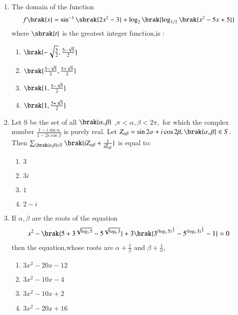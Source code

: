 \documentclass[journal]{IEEEtran}
\begin{document}
\begin{enumerate}
    \item The domain of the function 
    \begin{align*}
        f\brak{x} = \sin^{-1}\sbrak{2x^2 - 3}+ \log_2\brak{\log_{1/2}\brak{x^2 - 5x + 5}}
    \end{align*} where $\sbrak{t}$ is the greatest integer function,is :
    
    \begin{enumerate}
        \item $\brak{-\sqrt{\frac{5}{2}},\frac{5-\sqrt{5}}{2}}$
        \item $\brak{\frac{5-\sqrt{5}}{2}, \frac{5+\sqrt{5}}{2}}$
        \item $\brak{1,\frac{5-\sqrt{5}}{2}}$ 
        \item $\brak{1,\frac{5+\sqrt{5}}{2}}$ \\
    \end{enumerate}
    

    \item Let S be the set of all $\brak{\alpha,\beta}$ ,$\pi <\alpha, \beta < 2\pi , $ for which the complex number $\frac{1-i\sin\alpha}{1-2i\cos\beta}$ is purely real. Let $Z_{\alpha\beta} =\sin2\alpha + i\cos2\beta,\brak{\alpha,\beta} \in S $. Then $\sum_{\brak{\alpha,\beta}\in S }\brak{iZ_{\alpha\beta} + \frac{1}{i\bar{Z}_{\alpha\beta}}} $ is equal to: 
    
    \begin{enumerate}
        \item $3$
        \item $3i$
        \item $1$
        \item $2-i$
    \end{enumerate}
    

    \item  If $\alpha, \beta$ are the roots of the equation 
    \begin{align*}
        x^{2} - \brak{5 + 3^{\sqrt{\log_3{5}}} -  5^{\sqrt{\log_5{3}}}}  +  3\brak{3^{(\log_3{5})^\frac{1}{3}} - 5^{(\log_5{3})^\frac{2}{3}} - 1} = 0
    \end{align*} 
    then the equation,whose roots are $\alpha + \frac{1}{\beta} $ and $\beta + \frac{1}{\alpha},$ 
    
    \begin{enumerate}
        \item $3x^2 - 20x -12$
        \item $3x^2 -10x-4$ 
        \item $3x^2 - 10x +2$ 
        \item $3x^2 -20x + 16$   
    \end{enumerate}



\end{enumerate}
\end{document}
